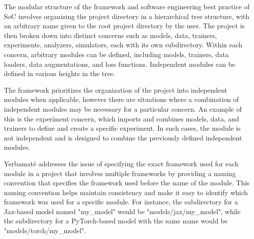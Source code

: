 
 The modular structure of the framework and software engineering best practice of SoC involves organizing the project directory in a hierarchical tree structure, with an arbitrary name given to the root project directory by the user. The project is then broken down into distinct concerns such as models, data, trainers, experiments, analyzers, simulators, each with its own subdirectory. Within each concern, arbitrary modules can be defined, including models, trainers, data loaders, data augmentations, and loss functions. Independent modules can be defined in various heights in the tree.

The framework prioritizes the organization of the project into independent modules when applicable, however there are situations where a combination of independent modules may be necessary for a particular concern. An example of this is the experiment concern, which imports and combines models, data, and trainers to define and create a specific experiment. In such cases, the module is not independent and is designed to combine the previously defined independent modules. 

Yerbamaté addresses the issue of specifying the exact framework used for each module in a project that involves multiple frameworks by providing a naming convention that specifies the framework used before the name of the module. This naming convention helps maintain consistency and make it easy to identify which framework was used for a specific module. For instance, the subdirectory for a Jax-based model named "my\_model" would be "models/jax/my\_model", while the subdirectory for a PyTorch-based model with the same name would be "models/torch/my\_model".


